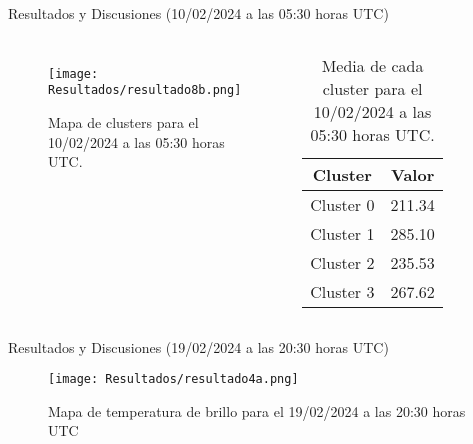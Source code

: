 \documentclass[aspectratio=169,xcolor=dvipsnames]{beamer}
\begin{document}
\begin{frame}{Resultados y Discusiones (10/02/2024 a las 05:30 horas UTC)}
    \begin{columns}

        \begin{figure}
            \centering
            \texttt{[image: Resultados/resultado8b.png]}
            {\footnotesize %
            \caption{Mapa de clusters para el 10/02/2024 a las 05:30 horas UTC.}
            \label{fig13}
            }
        \end{figure}

        \centering
        \begin{table}[h!]
            \centering
            {\footnotesize %
            \begin{tabular}{|c|c|}
                \hline
                \textbf{Cluster} & \textbf{Valor} \\
                \hline
                Cluster 0 & 211.34 \\
                Cluster 1 & 285.10 \\
                Cluster 2 & 235.53 \\
                Cluster 3 & 267.62 \\                
                \hline
            \end{tabular}
            \caption{Media de cada cluster para el 10/02/2024 a las 05:30 horas UTC.}
            }
        \end{table}

    \end{columns}
\end{frame}
\begin{frame}{Resultados y Discusiones (19/02/2024 a las 20:30 horas UTC)}
\begin{figure}
    \centering
    \texttt{[image: Resultados/resultado4a.png]}
    \caption{Mapa de temperatura de brillo para el 19/02/2024 a las 20:30 horas UTC}
    \label{fig14}
\end{figure}
\end{frame}
\end{document}
